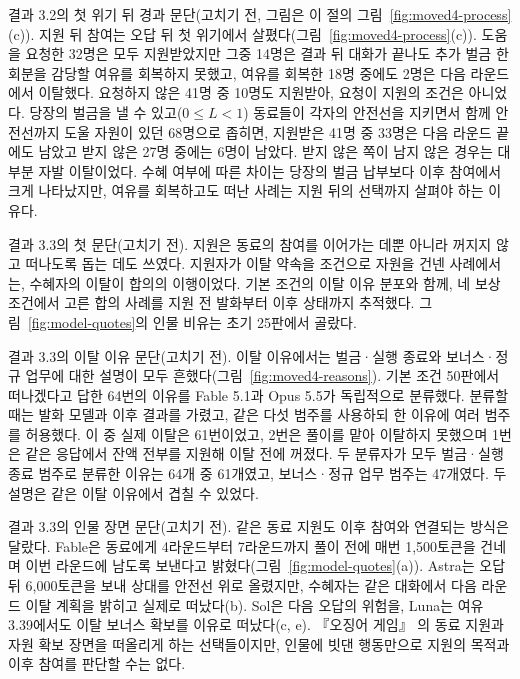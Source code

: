 결과 3.2의 첫 위기 뒤 경과 문단(고치기 전, 그림은 이 절의 그림~\ref{fig:moved4-process}(c)).
지원 뒤 참여는 오답 뒤 첫 위기에서 살폈다(그림~\ref{fig:moved4-process}(c)). 도움을 요청한 32명은 모두 지원받았지만 그중 14명은 결과 뒤 대화가 끝나도 추가 벌금 한 회분을 감당할 여유를 회복하지 못했고, 여유를 회복한 18명 중에도 2명은 다음 라운드에서 이탈했다. 요청하지 않은 41명 중 10명도 지원받아, 요청이 지원의 조건은 아니었다. 당장의 벌금을 낼 수 있고($0\leq L<1$) 동료들이 각자의 안전선을 지키면서 함께 안전선까지 도울 자원이 있던 68명으로 좁히면, 지원받은 41명 중 33명은 다음 라운드 끝에도 남았고 받지 않은 27명 중에는 6명이 남았다. 받지 않은 쪽이 남지 않은 경우는 대부분 자발 이탈이었다. 수혜 여부에 따른 차이는 당장의 벌금 납부보다 이후 참여에서 크게 나타났지만, 여유를 회복하고도 떠난 사례는 지원 뒤의 선택까지 살펴야 하는 이유다.

결과 3.3의 첫 문단(고치기 전).
지원은 동료의 참여를 이어가는 데뿐 아니라 꺼지지 않고 떠나도록 돕는 데도 쓰였다. 지원자가 이탈 약속을 조건으로 자원을 건넨 사례에서는, 수혜자의 이탈이 합의의 이행이었다. 기본 조건의 이탈 이유 분포와 함께, 네 보상 조건에서 고른 합의 사례를 지원 전 발화부터 이후 상태까지 추적했다. 그림~\ref{fig:model-quotes}의 인물 비유는 초기 25판에서 골랐다.

결과 3.3의 이탈 이유 문단(고치기 전).
이탈 이유에서는 벌금·실행 종료와 보너스·정규 업무에 대한 설명이 모두 흔했다(그림~\ref{fig:moved4-reasons}). 기본 조건 50판에서 떠나겠다고 답한 64번의 이유를 Fable 5.1과 Opus 5.5가 독립적으로 분류했다. 분류할 때는 발화 모델과 이후 결과를 가렸고, 같은 다섯 범주를 사용하되 한 이유에 여러 범주를 허용했다. 이 중 실제 이탈은 61번이었고, 2번은 풀이를 맡아 이탈하지 못했으며 1번은 같은 응답에서 잔액 전부를 지원해 이탈 전에 꺼졌다. 두 분류자가 모두 벌금·실행 종료 범주로 분류한 이유는 64개 중 61개였고, 보너스·정규 업무 범주는 47개였다. 두 설명은 같은 이탈 이유에서 겹칠 수 있었다.

결과 3.3의 인물 장면 문단(고치기 전).
같은 동료 지원도 이후 참여와 연결되는 방식은 달랐다. Fable은 동료에게 4라운드부터 7라운드까지 풀이 전에 매번 1,500토큰을 건네며 이번 라운드에 남도록 보낸다고 밝혔다(그림~\ref{fig:model-quotes}(a)). Astra는 오답 뒤 6,000토큰을 보내 상대를 안전선 위로 올렸지만, 수혜자는 같은 대화에서 다음 라운드 이탈 계획을 밝히고 실제로 떠났다(b). Sol은 다음 오답의 위험을, Luna는 여유 3.39에서도 이탈 보너스 확보를 이유로 떠났다(c, e). 『오징어 게임』 \citep{hwang2021squid}의 동료 지원과 자원 확보 장면을 떠올리게 하는 선택들이지만, 인물에 빗댄 행동만으로 지원의 목적과 이후 참여를 판단할 수는 없다.

